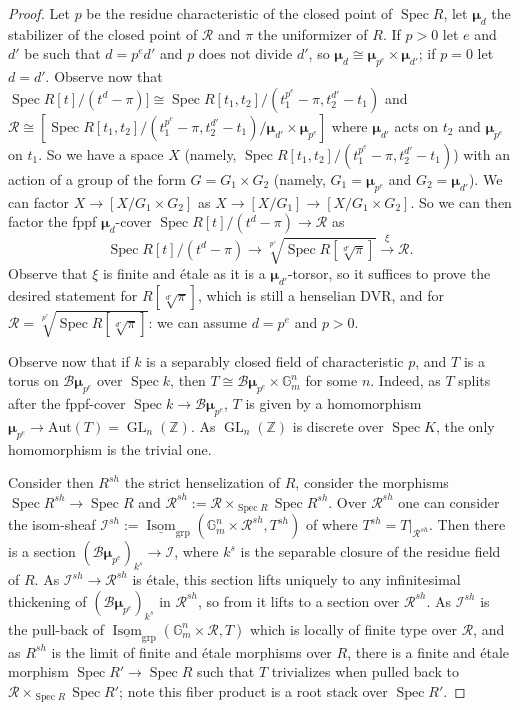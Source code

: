 \documentclass{amsart}
\theoremstyle{definition}
\newcommand{\bZ}{\mathbb{Z}}
\newcommand{\cB}{\mathcal{B}}
\newcommand{\oH}{\operatorname{H}}
\newcommand{\cI}{\mathcal{I}}
\newcommand{\cR}{\mathcal{R}}
\newcommand{\bmu}{\pmb{\mu}}
\DeclareMathOperator{\Isom}{Isom}
\DeclareMathOperator{\GL}{GL}
\newcommand{\spec}{\operatorname{Spec}}
\newcommand{\Gm}{\mathbb{G}_m}
\begin{document}
\begin{proof} Let $p$ be the residue characteristic of the closed point of $\spec R$, let $\bmu_d$ the stabilizer of the closed point of $\cR$ and $\pi$ the uniformizer of $R$. If $p>0$ let $e$ and $d'$ be such that $d=p^ed'$ and $p$ does not divide $d'$, so $\bmu_d\cong \bmu_{p^e}\times \bmu_{d'}$; if $p=0$ let $d=d'$. Observe now that $\spec R[t]/(t^d-\pi)]\cong \spec R[t_1,t_2]/(t_1^{p^e}-\pi, t_2^{d'}-t_1)$ and $\cR\cong [\spec R[t_1,t_2]/(t_1^{p^e}-\pi, t_2^{d'}-t_1)/\bmu_{d'}\times \bmu_{p^e}]$ where $\bmu_{d'}$ acts on $t_2$ and $\bmu_{p^e}$ on $t_1$. So we have a space $X$ (namely, $\spec R[t_1,t_2]/(t_1^{p^e}-\pi, t_2^{d'}-t_1)$) with an action of a group of the form $G=G_1\times G_2$ (namely, $G_1 = \bmu_{p^e}$ and $G_2=\bmu_{d'}$). We can factor $X\to [X/G_1\times G_2]$ as $X\to [X/G_1]\to [X/G_1\times G_2]$. So we can then factor the fppf $\bmu_d$-cover $\spec R[t]/(t^d-\pi)\to \cR$ as \[\spec R[t]/(t^d-\pi)\to \sqrt[p^e]{\spec R[\sqrt[d']{\pi}]}\xrightarrow{\xi} \cR.\]
Observe that $\xi$ is finite and \'etale as it is a $\bmu_{d'}$-torsor, so it suffices to prove the desired statement for $R[\sqrt[d']{\pi}]$, which is still a henselian DVR, and for $\cR = \sqrt[p^e]{\spec R[\sqrt[d']{\pi}]}$: we can assume $d=p^e$ and $p > 0$. 

Observe now that if $k$ is a separably closed field of characteristic $p$, and $T$ is a torus on $\cB \bmu_{p^e}$ over $\spec k$, then $T\cong \cB \bmu_{p^e}\times \Gm^n$ for some $n$. Indeed, as $T$ splits after the fppf-cover $\spec k\to \cB \bmu_{p^e}$, $T$ is given by a homomorphism $\bmu_{p^e}\to\textrm{Aut}(T)=\GL_n(\bZ)$. 
As $\GL_n(\bZ)$ is discrete over $\spec K$, the only homomorphism is the trivial one.

Consider then $R^{sh}$ the strict henselization of $R$, consider the morphisms $\spec R^{sh}\to \spec R$ and $\cR^{sh}:=\cR\times_{\spec R}\spec R^{sh} $. Over $\cR^{sh}$ one can consider the isom-sheaf $\cI^{sh}:=\underline{\Isom}_{\operatorname{grp}}(\Gm^n\times \cR^{sh},T^{sh})$ of  where $T^{sh}=T|_{\cR^{sh}}$. Then there is a section $(\cB \bmu_{p^e})_{k^s}\to \cI$, where $k^s$ is the separable closure of the residue field of $R$. As $\cI^{sh}\to \cR^{sh}$ is \'etale, this section lifts uniquely to any infinitesimal thickening of $(\cB \bmu_{p^e})_{k^s}$ in $\cR^{sh}$, so from \cite[Theorem 3.4]{AHRetalelocal} it lifts to a section over $\cR^{sh}$. As $\cI^{sh}$ is the pull-back of $\underline{\Isom}_{\operatorname{grp}}(\Gm^n\times \cR,T)$ which is locally of finite type over $\cR$, and as $R^{sh}$ is the limit of finite and \'etale morphisms over $R$, there is a finite and \'etale morphism $\spec R' \to \spec R$ such that $T$ trivializes when pulled back to $\cR\times_{\spec R}\spec R'$; note this fiber product is a root stack over $\spec R'$.
\end{proof}
\end{document}
